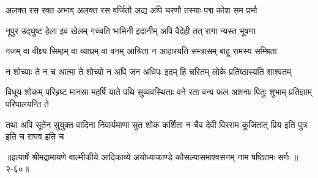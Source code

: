\twolineshloka
{अलक्त रस रक्त अभाव् अलक्त रस वर्जितौ}
{अद्य अपि चरणौ तस्याः पद्म कोश सम प्रभौ} %

\twolineshloka
{नूपुर उद्घुष्ट हेला इव खेलम् गच्चति भामिनी}
{इदानीम् अपि वैदेही तत् रागा न्यस्त भूषणा} %

\twolineshloka
{गजम् वा वीक्ष्य सिम्हम् वा व्याघ्रम् वा वनम् आश्रिता}
{न आहारयति सम्त्रासम् बाहू रामस्य सम्श्रिता} %

\twolineshloka
{न शोच्याः ते न च आत्मा ते शोच्यो न अपि जन अधिपः}
{इदम् हि चरितम् लोके प्रतिष्ठास्यति शाश्वतम्} %

\fourlineindentedshloka
{विधूय शोकम् परिहृष्ट मानसा}
{महर्षि याते पथि सुव्यवस्थिताः}
{वने रता वन्य फल अशनाः पितुः}
{शुभाम् प्रतिज्ञाम् परिपालयन्ति ते} %

\fourlineindentedshloka
{तथा अपि सूतेन सुयुक्त वादिना}
{निवार्यमाणा सुत शोक कर्शिता}
{न चैव देवी विरराम कूजितात्}
{प्रिय इति पुत्र इति च राघव इति च} %


॥इत्यार्षे श्रीमद्रामायणे वाल्मीकीये आदिकाव्ये अयोध्याकाण्डे कौसल्यासमाश्वसनम् नाम षष्ठितमः सर्गः ॥२-६०॥
